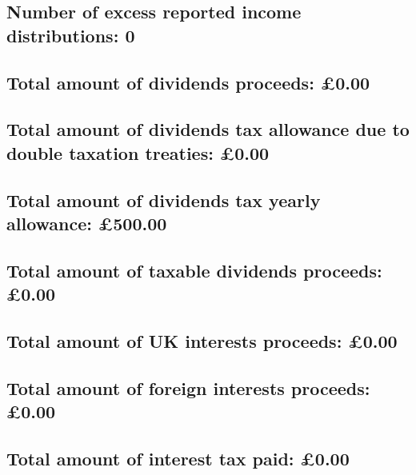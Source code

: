 \documentclass{article}
\begin{document}
\subsection*{Number of excess reported income distributions: 0}
\subsection*{Total amount of dividends proceeds: £0.00}
\subsection*{Total amount of dividends tax allowance due to double taxation treaties: £0.00}
\subsection*{Total amount of dividends tax yearly allowance: £500.00}
\subsection*{Total amount of taxable dividends proceeds: £0.00}
\subsection*{Total amount of UK interests proceeds: £0.00}
\subsection*{Total amount of foreign interests proceeds: £0.00}
\subsection*{Total amount of interest tax paid: £0.00}
\end{document}
